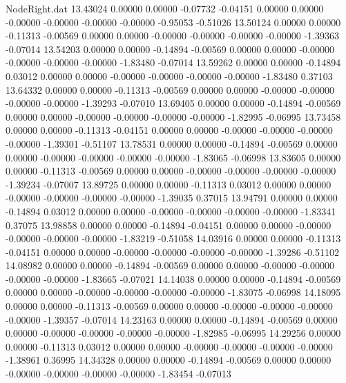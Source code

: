 \begin{filecontents}{NodeRight.dat}
  13.43024    0.00000    0.00000    -0.07732   -0.04151    0.00000    0.00000   -0.00000   -0.00000   -0.00000   -0.00000   -0.95053   -0.51026
  13.50124    0.00000    0.00000    -0.11313   -0.00569    0.00000    0.00000   -0.00000   -0.00000   -0.00000   -0.00000   -1.39363   -0.07014
  13.54203    0.00000    0.00000    -0.14894   -0.00569    0.00000    0.00000   -0.00000   -0.00000   -0.00000   -0.00000   -1.83480   -0.07014
  13.59262    0.00000    0.00000    -0.14894    0.03012    0.00000    0.00000   -0.00000   -0.00000   -0.00000   -0.00000   -1.83480    0.37103
  13.64332    0.00000    0.00000    -0.11313   -0.00569    0.00000    0.00000   -0.00000   -0.00000   -0.00000   -0.00000   -1.39293   -0.07010
  13.69405    0.00000    0.00000    -0.14894   -0.00569    0.00000    0.00000   -0.00000   -0.00000   -0.00000   -0.00000   -1.82995   -0.06995
  13.73458    0.00000    0.00000    -0.11313   -0.04151    0.00000    0.00000   -0.00000   -0.00000   -0.00000   -0.00000   -1.39301   -0.51107
  13.78531    0.00000    0.00000    -0.14894   -0.00569    0.00000    0.00000   -0.00000   -0.00000   -0.00000   -0.00000   -1.83065   -0.06998
  13.83605    0.00000    0.00000    -0.11313   -0.00569    0.00000    0.00000   -0.00000   -0.00000   -0.00000   -0.00000   -1.39234   -0.07007
  13.89725    0.00000    0.00000    -0.11313    0.03012    0.00000    0.00000   -0.00000   -0.00000   -0.00000   -0.00000   -1.39035    0.37015
  13.94791    0.00000    0.00000    -0.14894    0.03012    0.00000    0.00000   -0.00000   -0.00000   -0.00000   -0.00000   -1.83341    0.37075
  13.98858    0.00000    0.00000    -0.14894   -0.04151    0.00000    0.00000   -0.00000   -0.00000   -0.00000   -0.00000   -1.83219   -0.51058
  14.03916    0.00000    0.00000    -0.11313   -0.04151    0.00000    0.00000   -0.00000   -0.00000   -0.00000   -0.00000   -1.39286   -0.51102
  14.08982    0.00000    0.00000    -0.14894   -0.00569    0.00000    0.00000   -0.00000   -0.00000   -0.00000   -0.00000   -1.83665   -0.07021
  14.14038    0.00000    0.00000    -0.14894   -0.00569    0.00000    0.00000   -0.00000   -0.00000   -0.00000   -0.00000   -1.83075   -0.06998
  14.18095    0.00000    0.00000    -0.11313   -0.00569    0.00000    0.00000   -0.00000   -0.00000   -0.00000   -0.00000   -1.39357   -0.07014
  14.23163    0.00000    0.00000    -0.14894   -0.00569    0.00000    0.00000   -0.00000   -0.00000   -0.00000   -0.00000   -1.82985   -0.06995
  14.29256    0.00000    0.00000    -0.11313    0.03012    0.00000    0.00000   -0.00000   -0.00000   -0.00000   -0.00000   -1.38961    0.36995
  14.34328    0.00000    0.00000    -0.14894   -0.00569    0.00000    0.00000   -0.00000   -0.00000   -0.00000   -0.00000   -1.83454   -0.07013

\end{filecontents}
